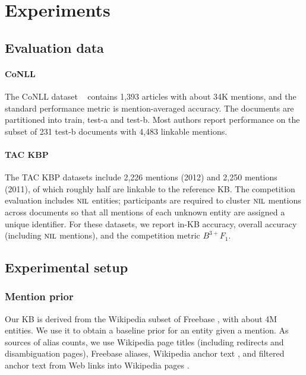 \section{Experiments}
\label{sec:expt}

\subsection{Evaluation data}

\paragraph{CoNLL} 
The CoNLL dataset ~\cite{Hoffart2011} contains 1,393 articles with
about 34K mentions, and the standard performance metric is
mention-averaged accuracy.  The documents are partitioned into train,
test-a and test-b.  Most authors report performance on the subset of
231 test-b documents with 4,483 linkable mentions.

\paragraph{TAC KBP} 
The TAC KBP datasets \cite{TAC2010,TAC2011,TAC2012} include 2,226 mentions
(2012) and 2,250 mentions (2011), of which roughly half are linkable
to the reference KB.  The competition evaluation includes $\mbox{\textsc{nil}}$
entities; participants are required to cluster $\mbox{\textsc{nil}}$ mentions across
documents so that all mentions of each unknown entity are assigned a
unique identifier.  For these datasets, we report in-KB accuracy,
overall accuracy (including $\mbox{\textsc{nil}}$ mentions), and the competition
metric $B^{3+} F_1$.

\subsection{Experimental setup}



\subsubsection{Mention prior}
Our KB is derived from the Wikipedia subset of Freebase , with about 4M entities. 
We use it to obtain a baseline prior for an entity given a mention. As sources of alias counts, we use
Wikipedia page titles (including redirects and disambiguation pages), Freebase aliases, 
Wikipedia anchor text ,  and
 filtered anchor text from Web links into Wikipedia pages
\cite{singh12:wiki-links}.

